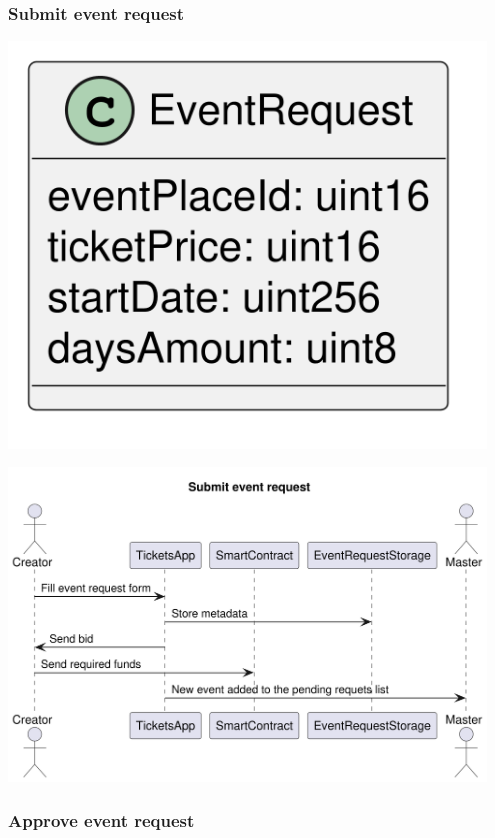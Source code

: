 \documentclass[11pt]{article}
\begin{document}
\subsubsection{Submit event request}
\label{sec:org99ee9bc}

\begin{center}
\includegraphics[width=0.95\textwidth]{./img/event-request.png}
\label{org9a64bfc}
\end{center}

\begin{center}
\includegraphics[width=0.95\textwidth]{./img/submit-event-request.png}
\label{org0238404}
\end{center}
\subsubsection{Approve event request}
\label{sec:org6dd85e9}
\end{document}

